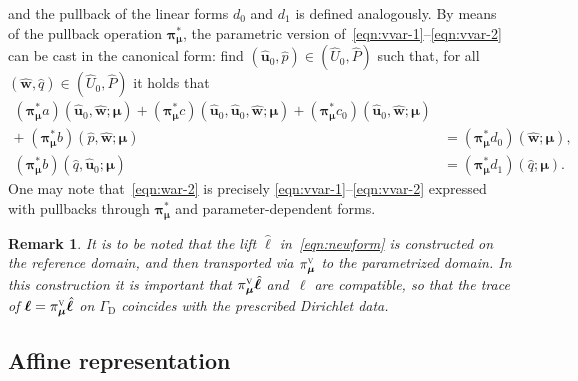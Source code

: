 \documentclass[onecolumn, twoside, a4paper, 11pt]{article}
\newtheorem{remark}{Remark}
\begin{document}
%
and the pullback of the linear forms $d_0$ and $d_1$ is defined analogously. By means of the
pullback operation ${\bm\pi}^*_{\bm\mu}$, the parametric version
of~\eqref{eqn:vvar-1}\nobreakdash--\eqref{eqn:vvar-2} can be cast
in the canonical form: find $(\hat{\bm u}_0, \hat{p}) \in (\hat{U}_0, \hat{P})$ such
that, for all $(\hat{\bm w}, \hat{q}) \in (\hat{U}_0, \hat{P})$ it holds
that
%
\begin{align}
  \nonumber (\bm\pi_{\bm\mu}^* a)(
    \hat{\bm u}_0,
    \hat{\bm w};
    \bm \mu
  ) + (\bm\pi_{\bm\mu}^* c)(
    \hat{\bm u}_0,
    \hat{\bm u}_0,
    \hat{\bm w};
    \bm \mu
  ) + (\bm\pi_{\bm\mu}^* c_0)(
    \hat{\bm u}_0,
    \hat{\bm w};
    \bm \mu
  )
  \\
  + \; (\bm\pi_{\bm\mu}^* b)(
    \hat{p},
    \hat{\bm w};
    \bm \mu
  ) &= (\bm\pi_{\bm\mu}^* d_0)(
    \hat{\bm w};
    \bm \mu
  )
  \label{eqn:war-1}, \\
  (\bm\pi_{\bm\mu}^* b)(
    \hat{q},
    \hat{\bm u}_0;
    \bm \mu
  ) &= (\bm\pi_{\bm\mu}^* d_1)(
    \hat{q};
    \bm \mu
  ). \label{eqn:war-2}
\end{align}
%
One may note that~\eqref{eqn:war-2} is precisely \eqref{eqn:vvar-1}--\eqref{eqn:vvar-2} expressed
with pullbacks through $\bm \pi_{\bm \mu}^*$ and parameter-dependent forms.

\begin{remark}
  \label{rem:lift}
  It is to be noted that the lift $\hat{\bm \ell}$ in~\eqref{eqn:newform} is constructed on
  the reference domain, and then transported
  via $\pi_{\bm \mu}^\textsc{v}$ to the parametrized domain. In this construction it is important
  that $\smash[t]{\pi_{\bm \mu}^\textsc{v} \hat{\bm \ell}}$ and~${\bm \ell}$ are compatible, so that
  the trace of $\bm{\ell}=\smash[t]{\pi_{\bm \mu}^\textsc{v}\hat{\bm \ell}}$ on $\Gamma_\text{D}$
  coincides with the prescribed Dirichlet data.
\end{remark}

\subsection{Affine representation}
\label{sec:affrep}
\end{document}
